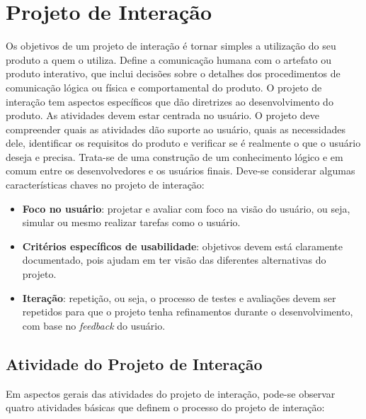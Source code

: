 \chapter[Projeto de Interação]{Projeto de Interação}

Os objetivos de um projeto de interação é tornar simples a utilização do seu produto a quem o utiliza. Define a comunicação humana com o artefato ou produto interativo, que inclui decisões sobre o detalhes dos procedimentos de comunicação lógica ou física e comportamental do produto.
O projeto de interação tem aspectos específicos que dão diretrizes ao desenvolvimento do produto. As atividades devem estar centrada no usuário. O projeto deve compreender quais as atividades dão suporte ao usuário, quais as necessidades dele, identificar os requisitos do produto e verificar se é realmente o que o usuário deseja e precisa. Trata-se de uma construção de um conhecimento lógico e em comum entre os desenvolvedores e os usuários finais.
Deve-se considerar algumas características chaves no projeto de interação:
\begin{itemize}
	\item \textbf{Foco no usuário}: projetar e avaliar com foco na visão do usuário, ou seja, simular ou mesmo realizar tarefas como o usuário.
	\item \textbf{Critérios específicos de usabilidade}: objetivos devem está claramente documentado, pois ajudam em ter visão das diferentes alternativas do projeto.
	\item \textbf{Iteração}: repetição, ou seja, o processo de testes e avaliações devem ser repetidos para que o projeto tenha refinamentos durante o desenvolvimento, com base no \textit{feedback} do usuário.
\end{itemize}

\section{Atividade do Projeto de Interação}

Em aspectos gerais das atividades do projeto de interação, pode-se observar quatro atividades básicas que definem o processo do projeto de interação:


